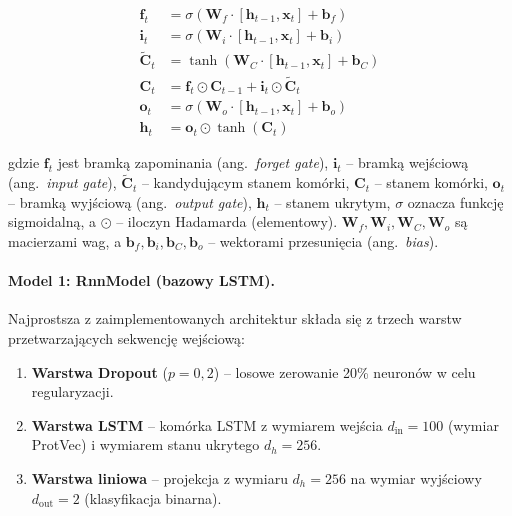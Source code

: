 \begin{align}
\mathbf{f}_t &= \sigma\left(\mathbf{W}_f \cdot [\mathbf{h}_{t-1}, \mathbf{x}_t] + \mathbf{b}_f\right) \label{eq:lstm-forget-impl} \\
\mathbf{i}_t &= \sigma\left(\mathbf{W}_i \cdot [\mathbf{h}_{t-1}, \mathbf{x}_t] + \mathbf{b}_i\right) \label{eq:lstm-input-impl} \\
\tilde{\mathbf{C}}_t &= \tanh\left(\mathbf{W}_C \cdot [\mathbf{h}_{t-1}, \mathbf{x}_t] + \mathbf{b}_C\right) \label{eq:lstm-candidate-impl} \\
\mathbf{C}_t &= \mathbf{f}_t \odot \mathbf{C}_{t-1} + \mathbf{i}_t \odot \tilde{\mathbf{C}}_t \label{eq:lstm-cell-impl} \\
\mathbf{o}_t &= \sigma\left(\mathbf{W}_o \cdot [\mathbf{h}_{t-1}, \mathbf{x}_t] + \mathbf{b}_o\right) \label{eq:lstm-output-impl} \\
\mathbf{h}_t &= \mathbf{o}_t \odot \tanh(\mathbf{C}_t) \label{eq:lstm-hidden-impl}
\end{align}

\noindent gdzie $\mathbf{f}_t$ jest bramką zapominania (ang.~\emph{forget gate}), $\mathbf{i}_t$ -- bramką wejściową (ang.~\emph{input gate}), $\tilde{\mathbf{C}}_t$ -- kandydującym stanem komórki, $\mathbf{C}_t$ -- stanem komórki, $\mathbf{o}_t$ -- bramką wyjściową (ang.~\emph{output gate}), $\mathbf{h}_t$ -- stanem ukrytym, $\sigma$ oznacza funkcję sigmoidalną, a $\odot$ -- iloczyn Hadamarda (elementowy). $\mathbf{W}_f, \mathbf{W}_i, \mathbf{W}_C, \mathbf{W}_o$ są macierzami wag, a $\mathbf{b}_f, \mathbf{b}_i, \mathbf{b}_C, \mathbf{b}_o$ -- wektorami przesunięcia (ang.~\emph{bias}).

\vspace{0.5cm}

\paragraph{Model 1: RnnModel (bazowy LSTM).}
Najprostsza z zaimplementowanych architektur składa się z trzech warstw przetwarzających sekwencję wejściową:

\begin{enumerate}
    \item \textbf{Warstwa Dropout} ($p = 0{,}2$) -- losowe zerowanie 20\% neuronów w celu regularyzacji.
    \item \textbf{Warstwa LSTM} -- komórka LSTM z wymiarem wejścia $d_{\text{in}} = 100$ (wymiar ProtVec) i wymiarem stanu ukrytego $d_h = 256$.
    \item \textbf{Warstwa liniowa} -- projekcja z wymiaru $d_h = 256$ na wymiar wyjściowy $d_{\text{out}} = 2$ (klasyfikacja binarna).
\end{enumerate}

